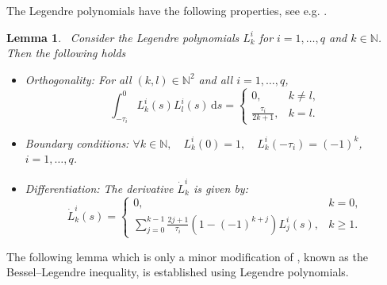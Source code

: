 \documentclass[12pt]{article}
\newtheorem{lemma}{Lemma}
\begin{document}
The Legendre polynomials have the following properties, see e.g. \cite{seuret2015hierarchy}.

\begin{lemma}\rm\ \label{Lemma:Legendre_polynomials_properties}
Consider the Legendre polynomials $L_k^i$ for $i=1,\ldots,q$ and $k \in \mathbb{N}$. Then the following holds 
\begin{itemize}
\item \textit{Orthogonality:} For all $(k, l) \in \mathbb{N}^2$ and all $i=1,\ldots,q$,
\begin{equation}\nonumber
    \int_{-\tau_i}^0 L_k^i(s)L_l^i(s) \, \mathrm{d}s = 
    \begin{cases} 
        0, & k \neq l, \\
        \frac{\tau_i}{2k+1}, & k = l.
    \end{cases}
\end{equation}
\item \textit{Boundary conditions:}
$    \forall k \in \mathbb{N}, \quad L_k^i(0) = 1, \quad L_k^i(-\tau_i) = (-1)^k$,\\ $i=1,\ldots,q$.

\item \textit{Differentiation:} The derivative $\dot{L}^i_k$ is given by:
\begin{equation}\nonumber
    \dot{L}^i_k(s) = 
    \begin{cases} 
        0, & k = 0, \\
        \displaystyle \sum_{j=0}^{k-1} \frac{2j+1}{\tau_i} \left(1 - (-1)^{k+j}\right) L^i_j(s), & k \ge 1.
    \end{cases}
\end{equation}
\end{itemize}
\end{lemma}
The following lemma which is only a minor modification of \cite[Corollary 4]{seuret2015hierarchy}, known as the Bessel–Legendre inequality, is 
established using Legendre polynomials. 
\end{document}
